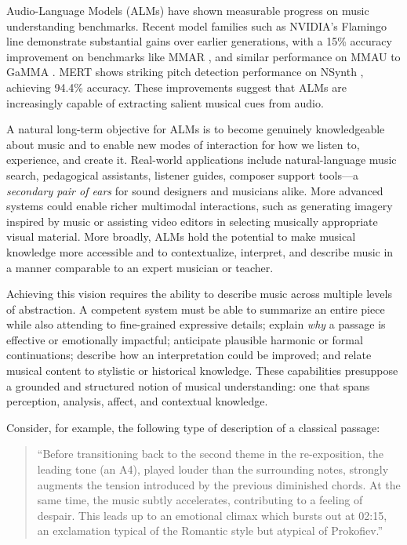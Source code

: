 \documentclass[conference,a4paper]{APSIPA2026}
\begin{document}
Audio-Language Models (ALMs) have shown measurable progress on music understanding benchmarks. Recent model families such as NVIDIA’s Flamingo line \cite{ghoshAudioFlamingoNext2026, ghoshMusicFlamingoScaling2025, goelAudioFlamingo32025} demonstrate substantial gains over earlier generations, with a 15\% accuracy improvement on benchmarks like MMAR \cite{maMMARChallengingBenchmark2025}, and similar performance on MMAU \cite{sakshiMMAUMassiveMultiTask2024} to GaMMA \cite{youGaMMAJointGlobalTemporal2026}. MERT \cite{liMERTAcousticMusic2024} shows striking pitch detection performance on NSynth \cite{nsynth2017}, achieving 94.4\% accuracy. These improvements suggest that ALMs are increasingly capable of extracting salient musical cues from audio.

A natural long-term objective for ALMs is to become genuinely knowledgeable about music and to enable new modes of interaction for how we listen to, experience, and create it. Real-world applications include natural-language music search, pedagogical assistants, listener guides, composer support tools—a \emph{secondary pair of ears} for sound designers and musicians alike. More advanced systems could enable richer multimodal interactions, such as generating imagery inspired by music or assisting video editors in selecting musically appropriate visual material. More broadly, ALMs hold the potential to make musical knowledge more accessible and to contextualize, interpret, and describe music in a manner comparable to an expert musician or teacher.

Achieving this vision requires the ability to describe music across multiple levels of abstraction. A competent system must be able to summarize an entire piece while also attending to fine-grained expressive details; explain \emph{why} a passage is effective or emotionally impactful; anticipate plausible harmonic or formal continuations; describe how an interpretation could be improved; and relate musical content to stylistic or historical knowledge. These capabilities presuppose a grounded and structured notion of musical understanding: one that spans perception, analysis, affect, and contextual knowledge.

Consider, for example, the following type of description of a classical passage:

\begin{quote}
“Before transitioning back to the second theme in the re-exposition, the leading tone (an A4), played louder than the surrounding notes, strongly augments the tension introduced by the previous diminished chords. At the same time, the music subtly accelerates, contributing to a feeling of despair. This leads up to an emotional climax which bursts out at 02:15, an exclamation typical of the Romantic style but atypical of Prokofiev.”
\end{quote}
\end{document}
